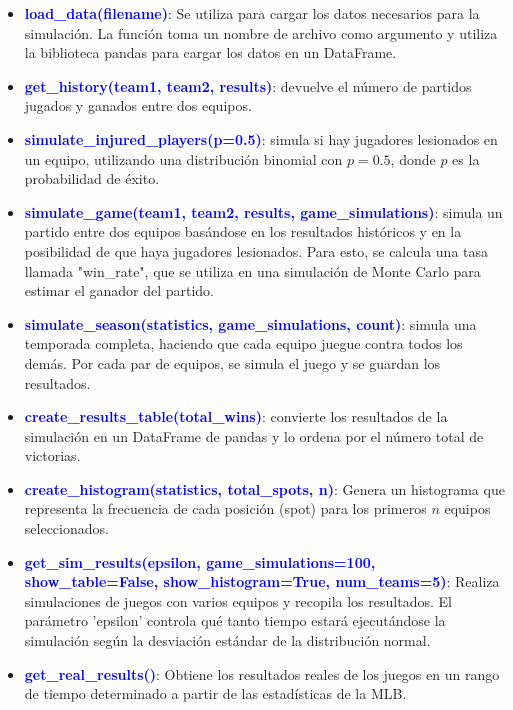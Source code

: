 \documentclass{article}
\begin{document}
        \begin{itemize}
            \item[\checkmark] \textbf{\textcolor{blue}{load\_data(filename)}}: Se utiliza para cargar los datos necesarios para la simulación. La función toma un nombre de archivo como argumento y utiliza la biblioteca pandas para cargar los datos en un DataFrame.
            \item[\checkmark] \textbf{\textcolor{blue}{get\_history(team1, team2, results)}}: devuelve el número de partidos jugados y ganados entre dos equipos.
            \item[\checkmark] \textbf{\textcolor{blue}{simulate\_injured\_players(p=0.5)}}: simula si hay jugadores lesionados en un equipo, utilizando una distribución binomial con $p = 0.5$, donde $p$ es la probabilidad de éxito.
            \item[\checkmark] \textbf{\textcolor{blue}{simulate\_game(team1, team2, results, game\_simulations)}}: simula un partido entre dos equipos basándose en los resultados históricos y en la posibilidad de que haya jugadores lesionados. Para esto, se calcula una tasa llamada "win\_rate", que se utiliza en una simulación de Monte Carlo para estimar el ganador del partido.
            \item[\checkmark] \textbf{\textcolor{blue}{simulate\_season(statistics, game\_simulations, count)}}: simula una temporada completa, haciendo que cada equipo juegue contra todos los demás. Por cada par de equipos, se simula el juego y se guardan los resultados.
            \item[\checkmark] \textbf{\textcolor{blue}{create\_results\_table(total\_wins)}}: convierte los resultados de la simulación en un DataFrame de pandas y lo ordena por el número total de victorias.
            \item[\checkmark] \textbf{\textcolor{blue}{create\_histogram(statistics, total\_spots, n)}}: Genera un histograma que representa la frecuencia de cada posición (spot) para los primeros $n$ equipos seleccionados.
            \item[\checkmark] \textbf{\textcolor{blue}{get\_sim\_results(epsilon, game\_simulations=100, show\_table=False, show\_histogram=True, num\_teams=5)}}: Realiza simulaciones de juegos con varios equipos y recopila los resultados. El parámetro 'epsilon' controla qué tanto tiempo estará ejecutándose la simulación según la desviación estándar de la distribución normal.
            \item[\checkmark] \textbf{\textcolor{blue}{get\_real\_results()}}: Obtiene los resultados reales de los juegos en un rango de tiempo determinado a partir de las estadísticas de la MLB.

\end{itemize}
\end{document}
